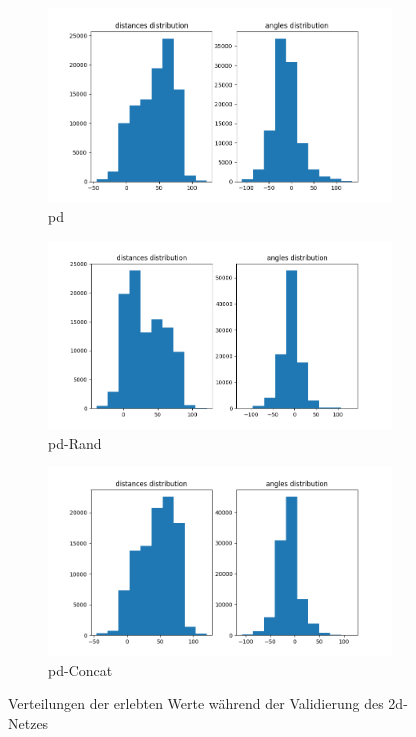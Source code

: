 \begin{figure}[H]
	\centering
	\begin{subfigure}[h]{0.5\textwidth}
		\centering
		\includegraphics[width=\linewidth]{kapitel5/images/eval/single-loss/pd-distr.png}
		\caption{\glqq\acs{pd}\grqq}
		\label{2d-pd-val-distr}
	\end{subfigure}%
	\begin{subfigure}[h]{0.5\textwidth}
		\centering
		\includegraphics[width=\linewidth]{kapitel5/images/eval/single-loss/pd-rand-distr.png}
		\caption{\glqq\acs{pd}-Rand\grqq}
		\label{2d-pd-rand-val-distr}
	\end{subfigure}
	\begin{subfigure}[h]{0.5\textwidth}
		\centering
		\includegraphics[width=\linewidth]{kapitel5/images/eval/single-loss/pd-concat-distr.png}
		\caption{\glqq\acs{pd}-Concat\grqq}
		\label{2d-pd-concat-val-distr}
	\end{subfigure}
	\caption{Verteilungen der erlebten Werte während der Validierung des \acs{2d}-Netzes}
	\label{2d-val-distr}
\end{figure}

